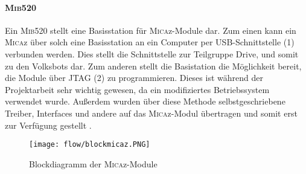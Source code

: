 \paragraph{\textsc{Mib}520}
Ein \textsc{Mib}520 stellt eine Basisstation für \textsc{Mica}z-Module dar. Zum einen kann ein \textsc{Mica}z über solch eine Basisstation an ein Computer per USB-Schnittstelle (1) verbunden werden. Dies stellt die Schnittstelle zur Teilgruppe Drive, und somit zu den Volksbots dar. Zum anderen stellt die Basistation die Möglichkeit bereit, die Module über JTAG (2) zu programmieren. Dieses ist während der Projektarbeit sehr wichtig gewesen, da ein modifiziertes Betriebssystem verwendet wurde. Außerdem wurden über diese Methode selbstgeschriebene Treiber, Interfaces und andere auf das \textsc{Mica}z-Modul übertragen und somit erst zur Verfügung gestellt \cite{MICSHEET}.

\begin{figure}[th]
  \centering
    \texttt{[image: flow/blockmicaz.PNG]}
    \caption{Blockdiagramm der \textsc{Mica}z-Module}
    \label{fig:blockmicaz}
\end{figure}
